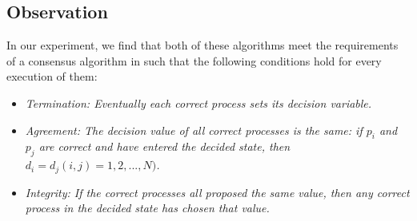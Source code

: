 \documentclass[dareport.tex]{subfiles}
\begin{document}
\subsection{Observation}

In our experiment, we find that both of these algorithms meet the requirements of a consensus algorithm\cite{coulouris} in such that the following conditions hold for every execution of them:
\begin{itemize}
\item \emph{Termination: Eventually each correct process sets its decision variable.}
\item \emph{Agreement: The decision value of all correct processes is the same: if $p_{i}$ and $p_{j}$ are correct and have entered the decided state, then $d_{i} = d_{j}   (i,j) = 1,2,...,N)$.}
\item \emph{Integrity: If the correct processes all proposed the same value, then any correct process in the decided state has chosen that value.}

\end{itemize}
\end{document}
